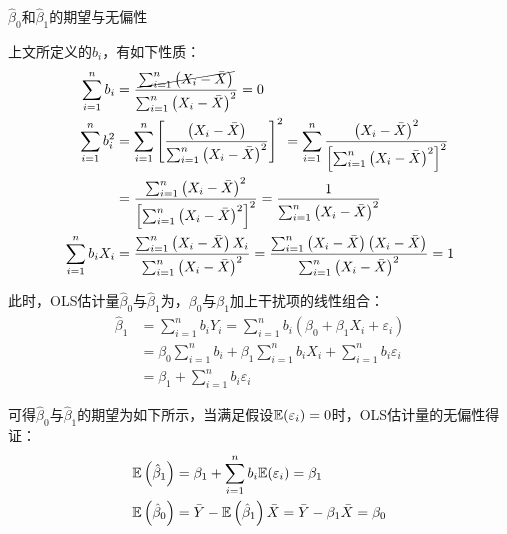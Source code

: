\documentclass[11pt]{article}
\begin{document}
\begin{property}
    $\hat{\beta}_0$和$\hat{\beta}_1$的期望与无偏性

    上文所定义的$b_i$，有如下性质：
    \begin{align*}
        \sum_{i=1}^{n} b_i
        &= \frac{\cancel{\sum_{i=1}^{n} \left(X_i - \bar{X}\right)}}{\sum_{i=1}^{n} \left(X_i - \bar{X}\right)^2} = 0 \\
        \sum_{i=1}^{n} b_i^2 
        &= \sum_{i=1}^{n} \left[ \frac{\left(X_i - \bar{X}\right)}{\sum_{i=1}^{n} \left(X_i - \bar{X}\right)^2} \right]^2
        = \sum_{i=1}^{n} \frac{\left(X_i - \bar{X}\right)^2}{ \left[ \sum_{i=1}^{n} \left(X_i - \bar{X}\right)^2 \right]^2} \\
        &= \frac{ \sum_{i=1}^{n} \left(X_i - \bar{X}\right)^2}{ \left[ \sum_{i=1}^{n} \left(X_i - \bar{X}\right)^2 \right]^2}
        = \frac{1}{\sum_{i=1}^{n} \left(X_i - \bar{X}\right)^2} \\
        \sum_{i=1}^{n} b_i X_i
        &= \frac{\sum_{i=1}^{n} \left(X_i - \bar{X}\right)X_i}{\sum_{i=1}^{n} \left(X_i - \bar{X}\right)^2}
        = \frac{\sum_{i=1}^{n} \left(X_i - \bar{X}\right) \left( X_i - \bar{X}\right)}{\sum_{i=1}^{n} \left(X_i - \bar{X}\right)^2} = 1
    \end{align*}

    此时，OLS估计量$\hat{\beta}_0$与$\hat{\beta}_1$为，$\beta_0$与$\beta_1$加上干扰项的线性组合：
    \begin{align*}
        \hat{\beta}_1
        &= \sum_{i=1}^{n} b_i Y_i 
        = \sum_{i=1}^{n} b_i \left( \beta_0 + \beta_1 X_i + \varepsilon_i \right) \\
        &=  \beta_0 \sum_{i=1}^{n} b_i + \beta_1 \sum_{i=1}^{n} b_i X_i + \sum_{i=1}^{n} b_i \varepsilon_i \\
        &= \beta_1 + \sum_{i=1}^{n} b_i \varepsilon_i
    \end{align*}

    可得$\hat{\beta}_0$与$\hat{\beta}_1$的期望为如下所示，当满足假设$\mathbb{E}(\varepsilon_i)=0$时，OLS估计量的无偏性得证：
    \begin{align*}
        \mathbb{E}\left( \hat{\beta}_1 \right)
        &= \beta_1 + \sum_{i=1}^{n} b_i \mathbb{E}(\varepsilon_i) = \beta_1 \\
        \mathbb{E}\left(\hat{\beta}_0 \right)
        &= \bar{Y} - \mathbb{E}\left( \hat{\beta}_1 \right) \bar{X}
        = \bar{Y} - \beta_1 \bar{X} = \beta_0
    \end{align*}
\end{property}
\end{document}
